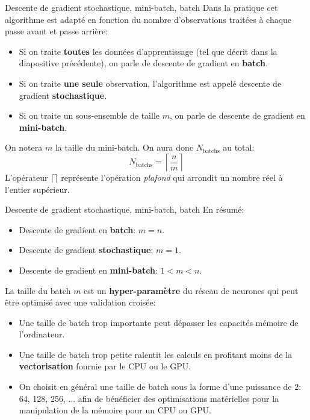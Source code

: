 \begin{frame}{Descente de gradient stochastique, mini-batch, batch}
	Dans la pratique cet algorithme est adapté en fonction du nombre d'observations traitées à chaque passe avant et passe arrière:
	\begin{itemize}
		\item Si on traite \textbf{toutes} les données d'apprentissage (tel que décrit dans la diapositive précédente), on parle de descente de gradient en \textbf{batch}.
		\pause
		\item Si on traite \textbf{une seule} observation, l'algorithme est appelé descente de gradient \textbf{stochastique}.
		\pause
		\item Si on traite un sous-ensemble de taille $m$, on parle de descente de gradient en \textbf{mini-batch}.
	\end{itemize}
	
	\pause
	\vspace{0.5cm}
	
	On notera $m$ la taille du mini-batch. On aura donc $N_{\text{batchs}}$ au total:
	\begin{equation*}
		N_{\text{batchs}} = \left\lceil \frac{n}{m} \right\rceil
	\end{equation*}
	L'opérateur $\lceil\rceil$ représente l'opération \textit{plafond} qui arrondit un nombre réel à l'entier supérieur.
\end{frame}

\begin{frame}{Descente de gradient stochastique, mini-batch, batch}
	En résumé:
	\begin{itemize}
		\item Descente de gradient en \textbf{batch}: $m = n$.
		\item Descente de gradient \textbf{stochastique}: $m = 1$.
		\item Descente de gradient en \textbf{mini-batch}: $1 < m < n$.
	\end{itemize}
	
	\pause
	\vspace{0.3cm}
	
	La taille du batch $m$ est un \textbf{hyper-paramètre} du réseau de neurones qui peut être optimisé avec une validation croisée:
	\begin{itemize}
		\item Une taille de batch trop importante peut dépasser les capacités mémoire de l'ordinateur.
		\item Une taille de batch trop petite ralentit les calculs en profitant moins de la \textbf{vectorisation} fournie par le CPU ou le GPU.
		\item On choisit en général une taille de batch sous la forme d'une puissance de 2: 64, 128, 256, ... afin de bénéficier des optimisations matérielles pour la manipulation de la mémoire pour un CPU ou GPU.
	\end{itemize}
\end{frame}

